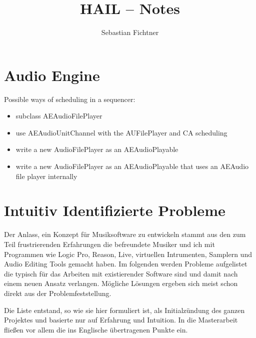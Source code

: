 \documentclass[12pt]{article}
\title{HAIL -- Notes}
\author{Sebastian Fichtner}
\date{}
\begin{document}
\maketitle

\section{Audio Engine}
Possible ways of scheduling in a sequencer:
\begin{itemize}
\item subclass AEAudioFilePlayer
\item use AEAudioUnitChannel with the AUFilePlayer and CA scheduling
\item write a new AudioFilePlayer as an AEAudioPlayable
\item write a new AudioFilePlayer as an AEAudioPlayable that uses an AEAudio file player internally
\end{itemize}

\pagebreak

\section{Intuitiv Identifizierte Probleme}

Der Anlass, ein Konzept f\"{u}r Musiksoftware zu entwickeln stammt aus den zum Teil frustrierenden Erfahrungen die befreundete Musiker und ich mit Programmen wie Logic Pro, Reason, Live, virtuellen Intrumenten, Samplern und Audio Editing Tools gemacht haben. Im folgenden werden Probleme aufgelistet die typisch f\"{u}r das Arbeiten mit existierender Software sind und damit nach einem neuen Ansatz verlangen. M\"{o}gliche L\"{o}sungen ergeben sich meist schon direkt aus der Problemfeststellung.

Die Liste entstand, so wie sie hier formuliert ist, als Initialz\"{u}ndung des ganzen Projektes und basierte nur auf Erfahrung und Intuition. In die Masterarbeit flie\ss en vor allem die ins Englische \"{u}bertragenen Punkte ein.
\end{document}
